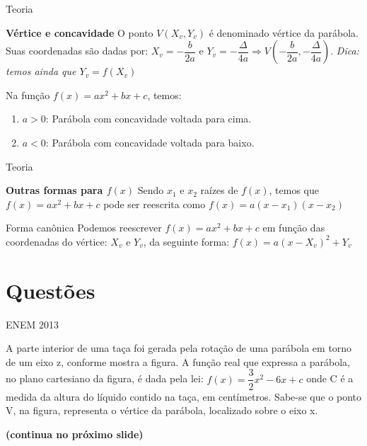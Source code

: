 \documentclass[11pt]{beamer}
\begin{document}
\begin{frame}{Teoria}

    \begin{block}{\textbf{Vértice e concavidade}}
        O ponto $V(X_{v}, Y_{v})$ é denominado vértice da parábola. Suas coordenadas são dadas por: $X_{v}=-\dfrac{b}{2a}$ e $Y_{v}=-\dfrac{\Delta}{4a} \Rightarrow  V \left ( -\dfrac{b}{2a}, -\dfrac{\Delta}{4a} \right )$. \textit{Dica: temos ainda que $Y_{v}=f(X_{v})$}
    \end{block}

    \pause 
    
    \begin{block}{}
        Na função $f(x)=ax^{2}+bx+c$, temos:

        \begin{enumerate}[I]
            \item $a > 0$: Parábola com concavidade voltada para cima.
            \item $a < 0$: Parábola com concavidade voltada para baixo.
        \end{enumerate}
    \end{block}
    
\end{frame}

\begin{frame}{Teoria}

    \begin{block}{\textbf{Outras formas para $f(x)$}}
        Sendo $x_{1}$ e $x_{2}$ raízes de $f(x)$, temos que $f(x)=ax^{2}+bx+c$ pode ser reescrita como $f(x)=a(x-x_{1})(x-x_ {2})$
    \end{block}

    \pause 
    
    \begin{block}{Forma canônica}
        Podemos reescrever $f(x)=ax^{2}+bx+c$ em função das coordenadas do vértice: $X_{v}$ e $Y_{v}$, da seguinte forma: $f(x)=a(x-X_{v})^{2}+Y_{v}$
        
    \end{block}
    
\end{frame}

\section{Questões}

\begin{frame}{ENEM 2013}
    
    A parte interior de uma taça foi gerada pela rotação de uma parábola em torno de um eixo z, conforme mostra a figura. A função real que expressa a parábola, no plano cartesiano da figura, é dada pela lei: $f(x)=\dfrac{3}{2}x^{2}-6x+c$ onde C é a medida da altura do líquido contido na taça, em centímetros. Sabe-se que o ponto V, na figura, representa o vértice da parábola, localizado sobre o eixo x. 

    \vfill
    \textbf{(continua no próximo slide)}
    
\end{frame}
\end{document}
